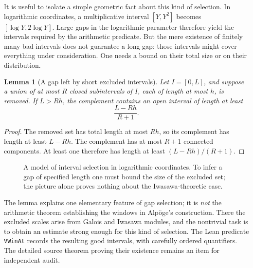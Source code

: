 \documentclass[11pt,openany,oneside]{scrbook}
\newtheorem{lemma}[theorem]{Lemma}
\theoremstyle{definition}
\theoremstyle{remark}
\begin{document}
It is useful to isolate a simple geometric fact about this kind of selection. In logarithmic coordinates, a multiplicative interval $[Y,Y^2]$ becomes $[\log Y,2\log Y]$. Large gaps in the logarithmic parameter therefore yield the intervals required by the arithmetic predicate. But the mere existence of finitely many bad intervals does not guarantee a long gap: those intervals might cover everything under consideration. One needs a bound on their total size or on their distribution.

\begin{lemma}[A gap left by short excluded intervals]\label{lem:gap}
Let $I=[0,L]$, and suppose a union of at most $R$ closed subintervals of $I$, each of length at most $h$, is removed. If $L>Rh$, the complement contains an open interval of length at least
\[
\frac{L-Rh}{R+1}.
\]
\end{lemma}
\begin{proof}
The removed set has total length at most $Rh$, so its complement has length at least $L-Rh$. The complement has at most $R+1$ connected components. At least one therefore has length at least $(L-Rh)/(R+1)$.
\end{proof}

\begin{figure}[ht]
\centering
{}
\caption{A model of interval selection in logarithmic coordinates. To infer a gap of specified length one must bound the size of the excluded set; the picture alone proves nothing about the Iwasawa-theoretic case.}
\end{figure}

The lemma explains one elementary feature of gap selection; it is \emph{not} the arithmetic theorem establishing the windows in Alp\"oge's construction. There the excluded scales arise from Galois and Iwasawa modules, and the nontrivial task is to obtain an estimate strong enough for this kind of selection. The Lean predicate \texttt{VWinAt} records the resulting good intervals, with carefully ordered quantifiers. The detailed source theorem proving their existence remains an item for independent audit.
\end{document}
